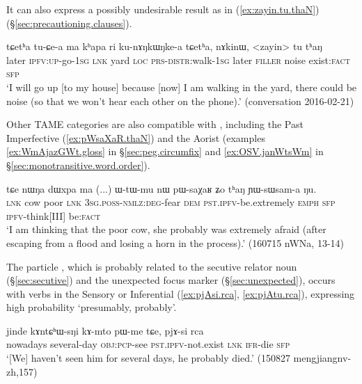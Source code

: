 It can also express a possibly undesirable result as in (\ref{ex:zayin.tu.thaN}) (§\ref{sec:precautioning.clauses}).

\begin{exe}
\ex \label{ex:zayin.tu.thaN}
\gll  tɕetʰa tu-ɕe-a ma kʰapa ri ku-nɤŋkɯŋke-a tɕetʰa, nɤkinɯ, <zayin> tu tʰaŋ \\
later \textsc{ipfv}:\textsc{up}-go-\textsc{1sg} \textsc{lnk} yard \textsc{loc} \textsc{prs}-\textsc{distr}:walk-\textsc{1sg}  later \textsc{filler} noise exist:\textsc{fact} \textsc{sfp} \\
\glt `I will go up [to my house] because [now] I am walking in the yard, there could be noise (so that we won't hear each other on the phone).' (conversation 2016-02-21)
\end{exe} 

Other TAME categories are also compatible with , including the Past Imperfective (\ref{ex:pWsaXaR.thaN}) and the Aorist (examples \ref{ex:WmAjazGWt.gloss} in §\ref{sec:peg.circumfix} and \ref{ex:OSV.janWtsWm} in §\ref{sec:monotransitive.word.order}).
 
\begin{exe} 
\ex \label{ex:pWsaXaR.thaN}
\gll tɕe nɯŋa dɯxpa ma  (...) ɯ-tɯ-mu nɯ pɯ-saχaʁ ʑo tʰaŋ ɲɯ-sɯsam-a ŋu. \\
\textsc{lnk} cow poor \textsc{lnk} { } \textsc{3sg}.\textsc{poss}-\textsc{nmlz}:\textsc{deg}-fear \textsc{dem} \textsc{pst}.\textsc{ipfv}-be.extremely \textsc{emph} \textsc{sfp} \textsc{ipfv}-think[III] be:\textsc{fact} \\
\glt  `I am thinking that the poor cow, she probably was extremely afraid (after escaping from a flood and losing a horn in the process).' (160715 nWNa, 13-14)
\end{exe} 

 
 The particle , which is probably related to the secutive relator noun  (§\ref{sec:secutive}) and the unexpected focus marker  (§\ref{sec:unexpected}), occurs with verbs in the Sensory or Inferential (\ref{ex:pjAsi.rca}, \ref{ex:pjAtu.rca}), expressing high probability `presumably, probably'.
 
\begin{exe} 
\ex \label{ex:pjAsi.rca}
\gll jinde kɤntɕʰɯ-sŋi kɤ-mto pɯ-me tɕe, pjɤ-si rca \\
nowadays several-day \textsc{obj}:\textsc{pcp}-see \textsc{pst}.\textsc{ipfv}-not.exist \textsc{lnk} \textsc{ifr}-die \textsc{sfp} \\
\glt `[We] haven't seen him for several days, he probably died.' (150827 mengjiangnv-zh,157)
\end{exe} 

